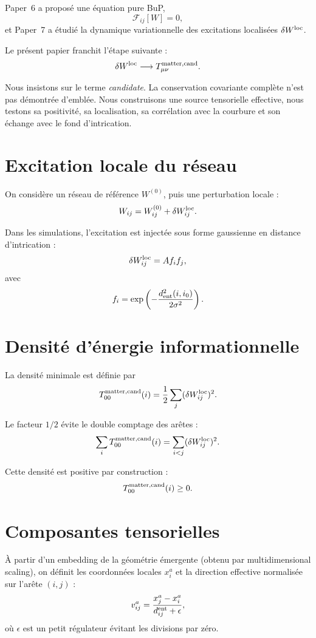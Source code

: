 \documentclass[11pt,a4paper]{article}
\begin{document}
Paper~6 a proposé une équation pure BuP,
\[
\mathcal{F}_{ij}[W]=0,
\]
et Paper~7 a étudié la dynamique variationnelle des excitations localisées
\(\delta W^{\rm loc}\).

Le présent papier franchit l'étape suivante :
\[
\delta W^{\rm loc}
\longrightarrow
T_{\mu\nu}^{\rm matter,cand}.
\]

Nous insistons sur le terme \emph{candidate}. La conservation covariante
complète n'est pas démontrée d'emblée. Nous construisons une source tensorielle
effective, nous testons sa positivité, sa localisation, sa corrélation avec la
courbure et son échange avec le fond d'intrication.

\section{Excitation locale du réseau}

On considère un réseau de référence \(W^{(0)}\), puis une perturbation locale :
\[
W_{ij}
=
W_{ij}^{(0)}
+
\delta W_{ij}^{\rm loc}.
\]

Dans les simulations, l'excitation est injectée sous forme gaussienne en
distance d'intrication :
\[
\delta W_{ij}^{\rm loc}
=
A f_i f_j,
\]
avec
\[
f_i
=
\exp\left(
-\frac{d_{\rm ent}^2(i,i_0)}{2\sigma^2}
\right).
\]

\section{Densité d'énergie informationnelle}

La densité minimale est définie par
\[
T_{00}^{\rm matter,cand}(i)
=
\frac12
\sum_j
(\delta W_{ij}^{\rm loc})^2.
\]

Le facteur \(1/2\) évite le double comptage des arêtes :
\[
\sum_i T_{00}^{\rm matter,cand}(i)
=
\sum_{i<j}
(\delta W_{ij}^{\rm loc})^2.
\]

Cette densité est positive par construction :
\[
T_{00}^{\rm matter,cand}(i)\ge0.
\]

\section{Composantes tensorielles}

À partir d'un embedding de la géométrie émergente (obtenu par
multidimensional scaling), on définit les coordonnées locales \(x_i^a\) et la
direction effective normalisée sur l'arête \((i,j)\) :
\[
v_{ij}^a
=
\frac{x_j^a - x_i^a}{d_{ij}^{\rm ent} + \epsilon},
\]
où \(\epsilon\) est un petit régulateur évitant les divisions par zéro.
\end{document}
